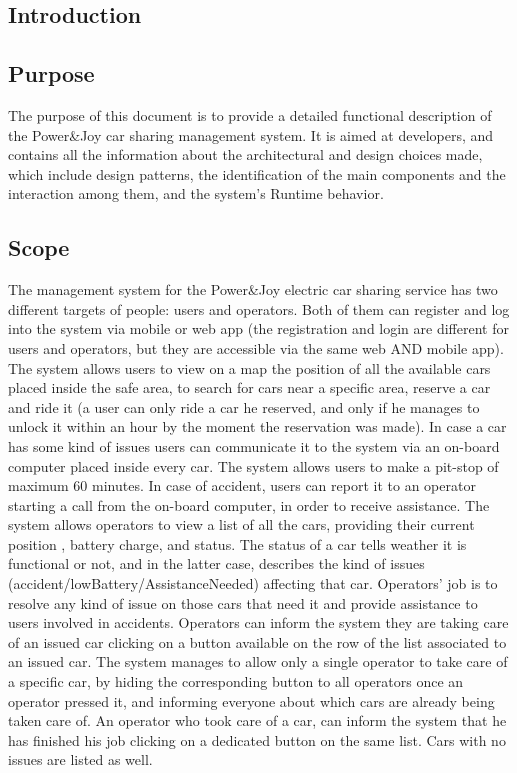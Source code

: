 \documentclass{article}
\begin{document}
\newpage   			%
\begin{flushleft}  

  \section{Introduction}


\subsection{Purpose}%

The purpose of this document is to provide a detailed functional description of the Power\&Joy car sharing management system. It is aimed at developers, and contains all the information about the architectural and design choices made, which include design patterns, the identification of the main components and the interaction among them, and the system's Runtime behavior.   
  
\subsection{Scope} %
The management system for the  Power\&Joy electric car sharing service has two different targets of people: users and operators. 
Both of them can register and log into the system via mobile or web app (the registration and login are different for users and operators, but they are accessible via the same web AND mobile app). 
The system allows users to view on a map the position of all the available cars placed inside the safe area, to search for cars  near a specific area, reserve a car and ride it (a user can only ride a car he reserved, and only if he manages to unlock it within an hour by the moment the reservation was made). In case a car has some kind of issues users can communicate it to the system via an on-board computer placed inside every car. The system allows users to make a pit-stop of maximum 60 minutes. In case of accident, users can report it to an operator starting a call from the on-board computer, in order to receive assistance.
The system allows operators to view a list of all the cars, providing their current position , battery charge, and status. The status of a car tells weather it is functional or not, and in the latter case, describes the kind of issues (accident/lowBattery/AssistanceNeeded) affecting that car. Operators' job is to resolve any kind of issue on those cars that need it and provide assistance to users involved in accidents. Operators can inform the system they are taking care of an issued car clicking on a button available on the row of the list associated to an issued car. The system manages to allow only a single operator to take care of a specific car, by hiding the corresponding button to all operators once an operator pressed it, and informing everyone about which cars are already being taken care of. An operator who took care of a car, can inform the system that he has finished his job clicking on a dedicated button on the same list. Cars with no issues are listed as well.


\end{flushleft}
\end{document}
